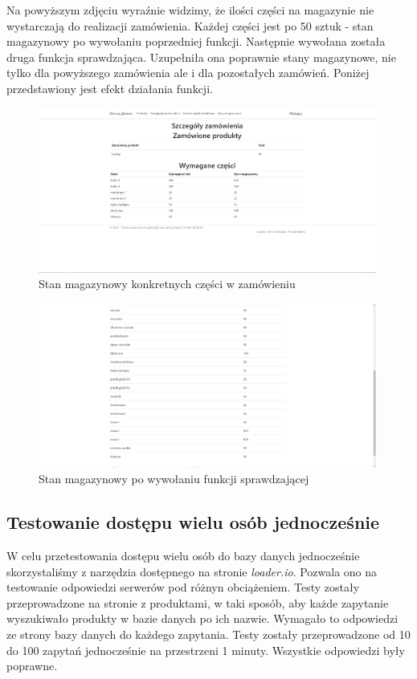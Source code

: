 \documentclass{article}
\begin{document}
Na powyższym zdjęciu wyraźnie widzimy, że ilości części na magazynie nie wystarczają do realizacji
zamówienia. Każdej części jest po 50 sztuk - stan magazynowy po wywołaniu poprzedniej funkcji.
Następnie wywołana została druga funkcja sprawdzająca.
Uzupełniła ona poprawnie stany magazynowe, nie tylko dla powyższego zamówienia ale i dla pozostałych
zamówień. Poniżej przedstawiony jest efekt działania funkcji.
\begin{figure}[H]
   \centering
   \includegraphics[width=0.99\textwidth,frame]{stan_mag_po_na specyfikacji.png}
   \caption{Stan magazynowy konkretnych części w zamówieniu}
\end{figure}

\begin{figure}[H]
   \centering
   \includegraphics[width=0.99\textwidth,frame]{magazyn po.png}
   \caption{Stan magazynowy po wywołaniu funkcji sprawdzającej}
\end{figure}


\subsection{Testowanie dostępu wielu osób jednocześnie}
W celu przetestowania dostępu wielu osób do bazy danych jednocześnie
skorzystaliśmy z narzędzia
dostępnego na stronie \textit{loader.io}. Pozwala ono na testowanie odpowiedzi
serwerów pod różnyn obciążeniem. Testy zostały przeprowadzone na stronie z
produktami, w taki sposób, aby każde zapytanie wyszukiwało produkty w bazie
danych po ich nazwie. Wymagało to odpowiedzi ze strony bazy danych do każdego
zapytania. Testy zostały przeprowadzone od 10 do 100 zapytań jednocześnie na
przestrzeni 1 minuty. Wszystkie odpowiedzi były poprawne.
\end{document}
